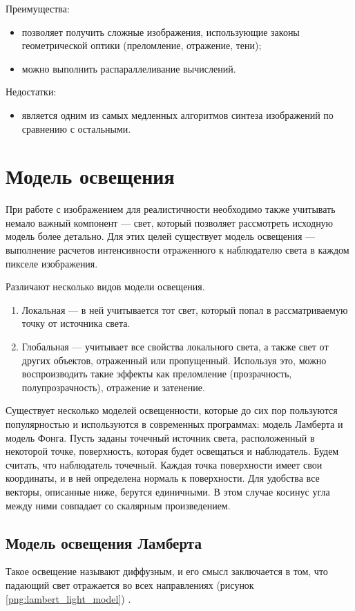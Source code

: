 Преимущества:
\begin{itemize}
	\item позволяет получить сложные изображения, использующие законы геометрической оптики (преломление, отражение, тени);
	\item можно выполнить распараллеливание вычислений.
\end{itemize}

Недостатки:
\begin{itemize}
	\item является одним из самых медленных алгоритмов синтеза изображений по сравнению с остальными.
\end{itemize}

\section{Модель освещения}
При работе с изображением для реалистичности необходимо также учитывать немало важный компонент — свет, который позволяет рассмотреть исходную модель более детально. Для этих целей существует модель освещения — выполнение расчетов интенсивности отраженного к наблюдателю света в каждом пикселе изображения.

Различают несколько видов модели освещения.
\begin{enumerate}
	\item Локальная — в ней учитывается тот свет, который попал в рассматриваемую точку от источника света.
	\item Глобальная — учитывает все свойства локального света, а также свет от других объектов, отраженный или пропущенный. Используя это, можно воспроизводить такие эффекты как преломление (прозрачность, полупрозрачность), отражение и затенение.
\end{enumerate}

Существует несколько моделей освещенности, которые до сих пор пользуются популярностью и используются в современных программах: модель Ламберта и модель Фонга. Пусть заданы точечный источник света, расположенный в некоторой точке, поверхность, которая будет освещаться и наблюдатель. Будем считать, что наблюдатель точечный. Каждая точка поверхности имеет свои координаты, и в ней определена нормаль к поверхности. Для удобства все векторы, описанные ниже, берутся единичными. В этом случае косинус угла между ними совпадает со скалярным произведением.

\subsection{Модель освещения Ламберта}
Такое освещение называют диффузным, и его смысл заключается в том, что падающий свет отражается во всех направлениях (рисунок \ref{png:lambert_light_model}) \cite{lambert_light_model}.
\begin{figure}[H]
\end{figure}

